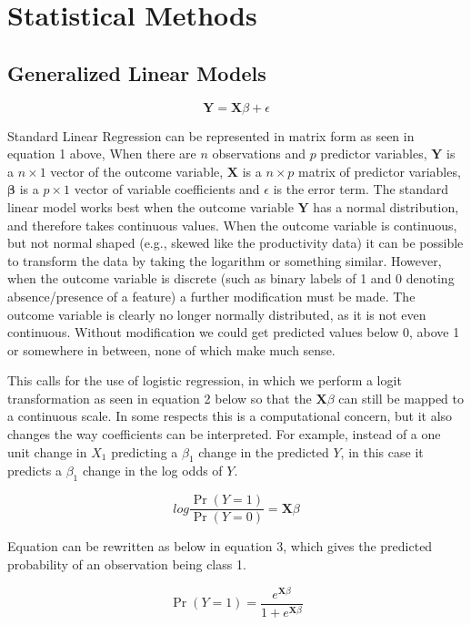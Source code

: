 \documentclass{article}
\newcommand{\bX}{\mathbf{X}}
\newcommand{\bY}{\mathbf{Y}}
\newcommand{\bbeta}{\mathbf{\beta}}
\begin{document}
\section{Statistical Methods} \label{stat_methods}

\subsection{Generalized Linear Models}

\[\bY = \bX\beta + \epsilon \tag{1}\]

Standard Linear Regression can be represented in matrix form as seen in equation 1 above, When there are $n$ observations and $p$ predictor variables,  $\bY$ is a $n \times 1$ vector of the outcome variable, $\bX$ is a $n \times p$ matrix of predictor variables, $\bbeta$ is a $p \times 1$ vector of variable coefficients and $\epsilon$ is the error 
term. The standard linear model works best when the outcome variable $\bY$ has a normal distribution, and therefore takes 
continuous values. When the outcome variable is continuous, but not normal shaped (e.g., skewed like the productivity 
data) it can be possible to transform the data by taking the logarithm or something similar. However, when the outcome 
variable is discrete (such as binary labels of 1 and 0 denoting absence/presence of a feature) a further modification must be made. The outcome variable is clearly no longer normally distributed, as it is not even continuous. Without modification we could get predicted values below 0, above 1 or somewhere in between, none of which make much sense.

This calls for the use of logistic regression, in which we perform a logit transformation as seen in equation 2 below so that the 
$\bX\beta$ can still be mapped to a continuous scale. In some respects this is a computational concern, but it also changes the 
way coefficients can be interpreted. For example, instead of a one unit change in $X_1$ predicting a $\beta_1$ change in the predicted $Y$, 
in this case it predicts a $\beta_1$ change in the log odds of $Y$.

\[log \frac{\Pr(Y = 1)}{\Pr(Y = 0)} = \bX\beta \tag{2}\]

Equation can be rewritten as below in equation 3, which gives the predicted probability of an observation being class 1.

\[ \Pr(Y = 1) = \frac{e^{\bX\beta}}{1 + e^{\bX\beta}} \tag{3}\]
\end{document}
